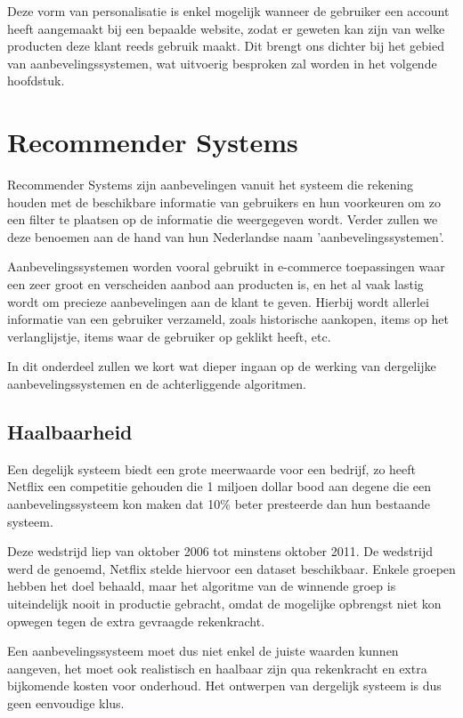 Deze vorm van personalisatie is enkel mogelijk wanneer de gebruiker een account heeft aangemaakt bij een bepaalde website, zodat er geweten kan zijn van welke producten deze klant reeds gebruik maakt. Dit brengt ons dichter bij het gebied van aanbevelingssystemen, wat uitvoerig besproken zal worden in het volgende hoofdstuk.

\section{Recommender Systems}
\label{sec:Recommender Systems}
Recommender Systems \autocite{Resnick1997} zijn aanbevelingen vanuit het systeem die rekening houden met de beschikbare informatie van gebruikers en hun voorkeuren om zo een filter te plaatsen op de informatie die weergegeven wordt. Verder zullen we deze benoemen aan de hand  van hun Nederlandse naam 'aanbevelingssystemen'.

Aanbevelingssystemen worden vooral gebruikt in e-commerce toepassingen waar een zeer groot en verscheiden aanbod aan producten is, en het al vaak lastig wordt om precieze aanbevelingen aan de klant te geven. Hierbij wordt allerlei informatie van een gebruiker verzameld, zoals historische aankopen, items op het verlanglijstje, items waar de gebruiker op geklikt heeft, etc.

In dit onderdeel zullen we kort wat dieper ingaan op de werking van dergelijke aanbevelingssystemen en de achterliggende algoritmen.

\subsection{Haalbaarheid}
\label{sec:Haalbaarheid}

Een degelijk systeem biedt een grote meerwaarde voor een bedrijf, zo heeft Netflix een competitie gehouden die 1 miljoen dollar bood aan degene die een aanbevelingssysteem kon maken dat 10\% beter presteerde dan hun bestaande systeem. 

Deze wedstrijd liep van oktober 2006 tot minstens oktober 2011. De wedstrijd werd de \cite{NetflixPrize} genoemd, Netflix stelde hiervoor een dataset beschikbaar. Enkele groepen hebben het doel behaald, maar het algoritme van de winnende groep is uiteindelijk nooit in productie gebracht, omdat de mogelijke opbrengst niet kon opwegen tegen de extra gevraagde rekenkracht. 

Een aanbevelingssysteem moet dus niet enkel de juiste waarden kunnen aangeven, het moet ook realistisch en haalbaar zijn qua rekenkracht en extra bijkomende kosten voor onderhoud. Het ontwerpen van dergelijk systeem is dus geen eenvoudige klus.

